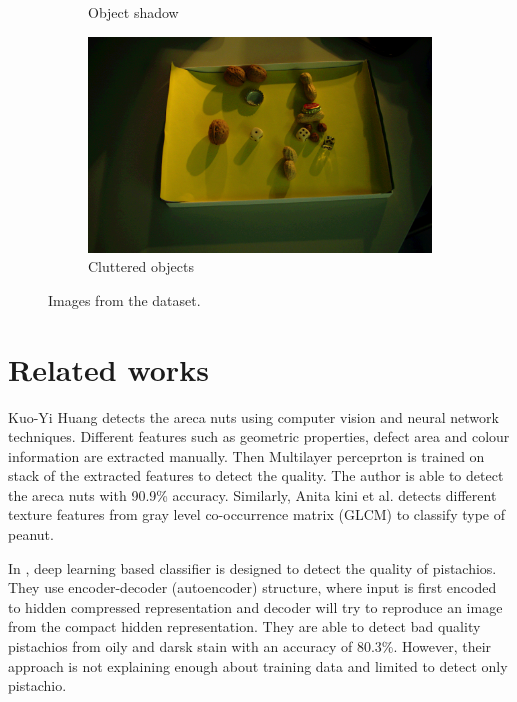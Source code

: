 \documentclass[journal,onecolumn,12pt]{IEEEtran}
\begin{document}
\begin{figure}
\begin{subfigure}[b]{0.3\textwidth}
		\caption{Object shadow} 
	\end{subfigure}
	\hfill
	\begin{subfigure}[b]{0.3\textwidth}  
		\centering 
		\includegraphics[width=\textwidth]{images/challenges/Cluttered_133.png}
		\caption{Cluttered objects} 
	\end{subfigure}
	\caption{Images from the dataset.}
	\label{fig:challenges}
\end{figure}


\section{Related works}
Kuo-Yi Huang \cite{Huang2012} detects the areca nuts using computer vision and neural network techniques. Different features such as geometric properties, defect area and colour information are extracted manually. Then Multilayer perceprton is trained on stack of the extracted features to detect the quality. The author is able to detect the areca nuts with 90.9\% accuracy. Similarly, Anita kini et al. \cite{Narendra2018} detects different texture features from gray level co-occurrence matrix (GLCM) to classify type of peanut.

In \cite{Mehdi2019}, deep learning based classifier is designed to detect the quality of pistachios. They use encoder-decoder (autoencoder) structure, where input is first encoded to hidden compressed representation and decoder will try to reproduce an image from the compact hidden representation. They are able to detect bad quality pistachios from oily and darsk stain with an accuracy of 80.3\%. However, their approach is not explaining enough about training data and limited to detect only pistachio.
\end{document}
